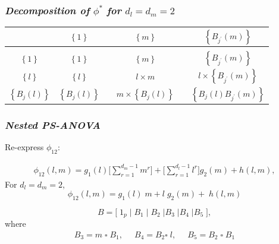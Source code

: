 \documentclass[12pt]{beamer}
\newcommand{\ms}{\scriptscriptstyle}
\begin{document}
\begin{frame}
\frametitle{\emph{Decomposition of} $\phi^*$ \emph{for} $d_l = d_m = 2$}


\begin{table}[h]
\centering %
\begin{tabular}{c|ccccc}
	&    $\left\{ 1 \right\}$	&&	$\left\{m \right\}$	 	&& 	$\left\{ B_{\ms{j^\prime}}\left(m\right) \right\} $ \\ [0.5ex]
\hline %
\\
$\left\{ 1 \right\}$ 				&  $\left\{ 1 \right\}$   	& &	$\left\{m \right\}$	 	&& 	$\left\{ B_{\ms{j^\prime}}\left(m\right) \right\} $	\\  [2.5ex] %
$\left\{l \right\}$		 		&  $\left\{ l \right\}$  	 &&	$l \times m$	 	&& 	$l \times \left\{   B_{\ms{j^\prime}}\left(m\right) \right\} $\\  [2.5ex]
$\left\{ B_j\left(l\right) \right\} $	 	&    $\left\{ B_j\left(l\right) \right\}$	&&	$ m \times \left\{ B_j\left(l\right) \right\}$	& &	$\left\{ B_j\left(l\right) B_{\ms{j^\prime}}\left(m\right) \right\}$ 
\end{tabular}
\end{table}

\end{frame}



\begin{frame}
\frametitle{\emph{Nested PS-ANOVA}}

Re-express $\phi_{\ms{12}}$:

\begin{align*}
 \phi_{\ms{12}}\left(l,m\right)  = g_{\ms 1}\left(l\right) \Big[ \sum_{r=1}^{\ms{d_m-1}} m^{\ms r}\Big] + \Big[ \sum_{r=1}^{\ms{d_l-1}} l^{\ms r} \Big] g_{\ms 2}\left(m\right)+ h\left( l,m \right),
\end{align*}
\noindent
For $d_l = d_m = 2$,
\[
 \phi_{\ms{12}}\left(l,m\right)  = g_{\ms 1}\left(l\right) \; m+ l \; g_{\ms 2}\left(m\right) + \; h\left( l,m \right) 
\]

\begin{equation} \label{eq:nested-SANOVA-basis-matrix}
B = \big[  \; 1_p \; \vert \;  B_1  \; \vert \;   B_2 \; \vert  B_3 \; \vert B_4 \; \vert B_5 \; \big],
\end{equation}
\noindent
where
\[
\begin{array}{ccc}
B_{\ms 3} = m \; \square \;  B_{\ms 1}, \;\; & B_{\ms 4}  = B_{\ms 2}  \square \; l, \;\; &  B_{\ms 5}= B_{\ms 2} \;\square \; B_{\ms 1} 
\end{array}
\]
\end{frame}
\end{document}
